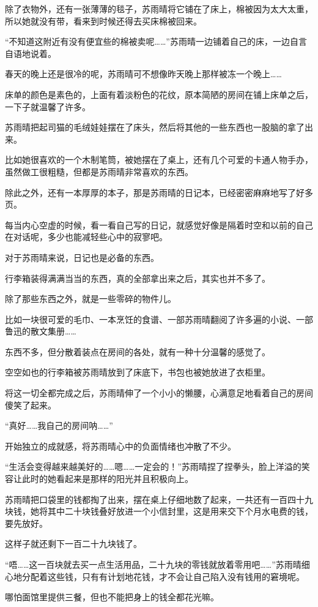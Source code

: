 除了衣物外，还有一张薄薄的毯子，苏雨晴将它铺在了床上，棉被因为太大太重，所以她就没有带，看来到时候还得去买床棉被回来。

“不知道这附近有没有便宜些的棉被卖呢……”苏雨晴一边铺着自己的床，一边自言自语地说着。

春天的晚上还是很冷的呢，苏雨晴可不想像昨天晚上那样被冻一个晚上……

床单的颜色是素色的，上面有着淡粉色的花纹，原本简陋的房间在铺上床单之后，一下子就温馨了许多。

苏雨晴把起司猫的毛绒娃娃摆在了床头，然后将其他的一些东西也一股脑的拿了出来。

比如她很喜欢的一个木制笔筒，被她摆在了桌上，还有几个可爱的卡通人物手办，虽然做工很粗糙，但都是苏雨晴非常喜欢的东西。

除此之外，还有一本厚厚的本子，那是苏雨晴的日记本，已经密密麻麻地写了好多页。

每当内心空虚的时候，看一看自己写的日记，就感觉好像是隔着时空和以前的自己在对话呢，多少也能减轻些心中的寂寥吧。

对于苏雨晴来说，日记也是必备的东西。

行李箱装得满满当当的东西，真的全部拿出来之后，其实也并不多了。

除了那些东西之外，就是一些零碎的物件儿。

比如一块很可爱的毛巾、一本烹饪的食谱、一部苏雨晴翻阅了许多遍的小说、一部鲁迅的散文集册……

东西不多，但分散着装点在房间的各处，就有一种十分温馨的感觉了。

空空如也的行李箱被苏雨晴放到了床底下，书包也被她放进了衣柜里。

将这一切全都完成之后，苏雨晴伸了一个小小的懒腰，心满意足地看着自己的房间傻笑了起来。

“真好……我自己的房间呐……”

开始独立的成就感，将苏雨晴心中的负面情绪也冲散了不少。

“生活会变得越来越美好的……嗯……一定会的！”苏雨晴捏了捏拳头，脸上洋溢的笑容让此时的她看起来是那样的阳光并且积极向上。

苏雨晴把口袋里的钱都掏了出来，摆在桌上仔细地数了起来，一共还有一百四十九块钱，她将其中二十块钱叠好放进一个小信封里，这是用来交下个月水电费的钱，要先放好。

这样子就还剩下一百二十九块钱了。

“唔……这一百块就去买一点生活用品，二十九块的零钱就放着零用吧……”苏雨晴细心地分配着这些钱，只有有计划地花钱，才不会让自己陷入没有钱用的窘境呢。

哪怕面馆里提供三餐，但也不能把身上的钱全都花光嘛。

